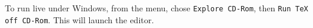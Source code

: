 \documentclass{article}
\begin{document}
\runlive

To run live under Windows, from the menu, chose \verb|Explore CD-Rom|, then  
\verb|Run TeX off CD-Rom|. This will launch the  editor.
  

  



\end{document}
